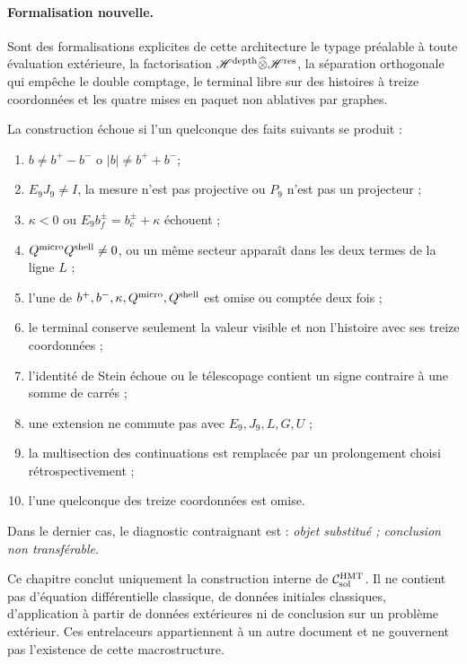 \paragraph{Formalisation nouvelle.}
Sont des formalisations explicites de cette architecture le typage préalable à toute
évaluation extérieure, la factorisation
\(\mathscr H^{\rm depth}\widehat\otimes\mathscr H^{\rm res}\), la séparation
orthogonale qui empêche le double comptage, le terminal libre sur des histoires à
treize coordonnées et les quatre mises en paquet non ablatives par graphes.

\begin{criterion}
\label{crit:pdfv2-sol-falsifiers}
La construction échoue si l'un quelconque des faits suivants se produit :
\begin{enumerate}
 \item \(b\neq b^+-b^-\) o \(|b|\neq b^++b^-\);
 \item \(E_9J_9\neq I\), la mesure n'est pas projective ou \(P_9\) n'est pas un
       projecteur ;
 \item \(\kappa<0\) ou
       \(E_9b_f^\pm=b_c^\pm+\kappa\) échouent ;
 \item \(Q^{\rm micro}Q^{\rm shell}\neq0\), ou un même secteur apparaît dans
       les deux termes de la ligne \(L\) ;
 \item l'une de \(b^+,b^-,\kappa,Q^{\rm micro},Q^{\rm shell}\) est omise ou
       comptée deux fois ;
 \item le terminal conserve seulement la valeur visible et non l'histoire avec ses
       treize coordonnées ;
 \item l'identité de Stein échoue ou le télescopage contient un signe
       contraire à une somme de carrés ;
 \item une extension ne commute pas avec \(E_9,J_9,L,G,U\) ;
 \item la multisection des continuations est remplacée par un prolongement
       choisi rétrospectivement ;
 \item l'une quelconque des treize coordonnées est omise.
\end{enumerate}
Dans le dernier cas, le diagnostic contraignant est : \emph{objet substitué ;
conclusion non transférable}.
\end{criterion}

\begin{warningbox}
Ce chapitre conclut uniquement la construction interne de
\(\mathcal C_{\rm sol}^{\rm HMT}\). Il ne contient pas d'équation différentielle
classique, de données initiales classiques, d'application à partir de données extérieures ni de
conclusion sur un problème extérieur. Ces entrelaceurs appartiennent à un autre
document et ne gouvernent pas l'existence de cette macrostructure.
\end{warningbox}
\fi
